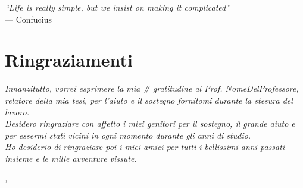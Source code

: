 
\cleardoublepage
{}
{}

\begin{flushright}{
	\slshape    
	``Life is really simple, but we insist on making it complicated''} \\ 
	\medskip
    --- Confucius
\end{flushright}


\bigskip

\begingroup
\let\clearpage\relax
\let\cleardoublepage\relax
\let\cleardoublepage\relax

\chapter*{Ringraziamenti}

\noindent \textit{Innanzitutto, vorrei esprimere la mia #
                  gratitudine al Prof. NomeDelProfessore, 
				  relatore della mia tesi, per l'aiuto e il 
				  sostegno fornitomi durante la stesura del 
				  lavoro.}\\

\noindent \textit{Desidero ringraziare con affetto i miei 
                  genitori per il sostegno, il grande aiuto 
				  e per essermi stati vicini in ogni momento 
				  durante gli anni di studio.}\\

\noindent \textit{Ho desiderio di ringraziare poi i miei 
                  amici per tutti i bellissimi anni passati 
				  insieme e le mille avventure vissute.}\\
\bigskip

\noindent\textit{\myLocation, \myTime}
\hfill \myName

\endgroup

